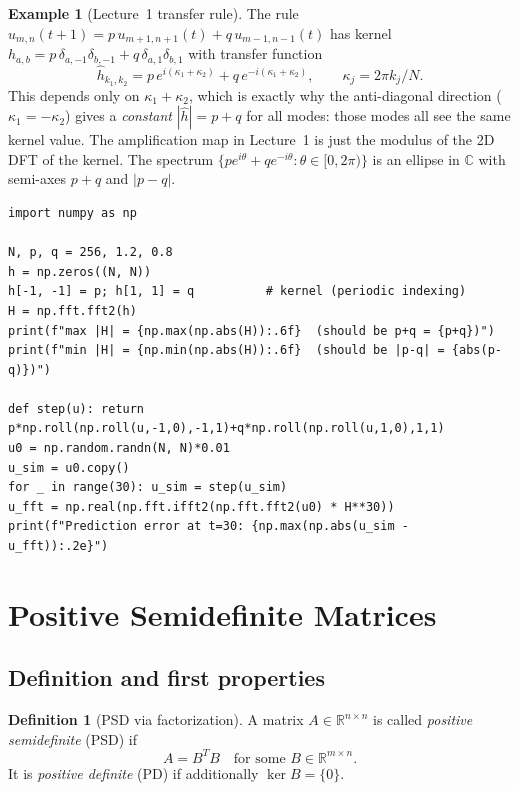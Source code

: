 \documentclass[11pt]{article}
\theoremstyle{definition}
\newtheorem{definition}{Definition}[section]
\newtheorem{example}{Example}[section]
\theoremstyle{plain}
\begin{document}
\begin{example}[Lecture~1 transfer rule]
  The rule $u_{m,n}(t+1)=p\,u_{m+1,n+1}(t)+q\,u_{m-1,n-1}(t)$ has kernel
  $h_{a,b}=p\,\delta_{a,-1}\delta_{b,-1}+q\,\delta_{a,1}\delta_{b,1}$
  with transfer function
  \[
    \hat h_{k_1,k_2}=p\,e^{i(\kappa_1+\kappa_2)}+q\,e^{-i(\kappa_1+\kappa_2)},
    \qquad \kappa_j=2\pi k_j/N.
  \]
  This depends only on $\kappa_1+\kappa_2$, which is exactly why the
  anti-diagonal direction ($\kappa_1=-\kappa_2$) gives a
  \emph{constant} $|\hat h|=p+q$ for all modes: those modes all see
  the same kernel value.  The amplification map in Lecture~1 is just
  the modulus of the 2D DFT of the kernel.  The spectrum
  $\{pe^{i\theta}+qe^{-i\theta}:\theta\in[0,2\pi)\}$ is an ellipse in
  $\mathbb{C}$ with semi-axes $p+q$ and $|p-q|$.
\end{example}

\begin{lstlisting}
import numpy as np

N, p, q = 256, 1.2, 0.8
h = np.zeros((N, N))
h[-1, -1] = p; h[1, 1] = q          # kernel (periodic indexing)
H = np.fft.fft2(h)
print(f"max |H| = {np.max(np.abs(H)):.6f}  (should be p+q = {p+q})")
print(f"min |H| = {np.min(np.abs(H)):.6f}  (should be |p-q| = {abs(p-q)})")

def step(u): return p*np.roll(np.roll(u,-1,0),-1,1)+q*np.roll(np.roll(u,1,0),1,1)
u0 = np.random.randn(N, N)*0.01
u_sim = u0.copy()
for _ in range(30): u_sim = step(u_sim)
u_fft = np.real(np.fft.ifft2(np.fft.fft2(u0) * H**30))
print(f"Prediction error at t=30: {np.max(np.abs(u_sim - u_fft)):.2e}")
\end{lstlisting}

\section{Positive Semidefinite Matrices}

\subsection{Definition and first properties}

\begin{definition}[PSD via factorization]
  A matrix $A\in\mathbb{R}^{n\times n}$ is called \emph{positive semidefinite}
  (PSD) if
  \[
    A = B^T B \quad \text{for some } B\in\mathbb{R}^{m\times n}.
  \]
  It is \emph{positive definite} (PD) if additionally $\ker B = \{0\}$.
\end{definition}
\end{document}
